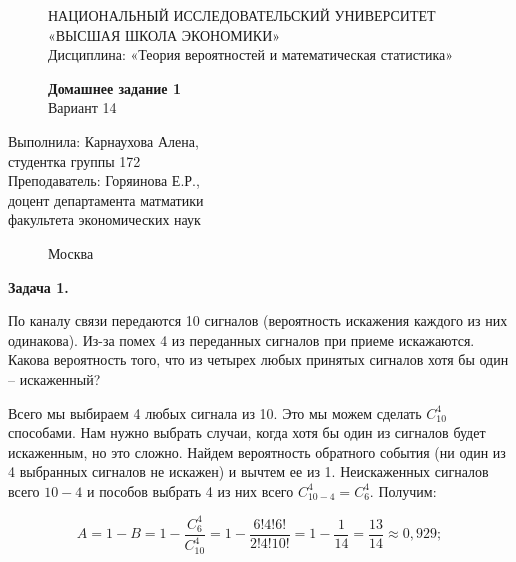 \documentclass[]{article}
\begin{document}
	\begin{figure}[t]
		\centering
		\large
		НАЦИОНАЛЬНЫЙ ИССЛЕДОВАТЕЛЬСКИЙ УНИВЕРСИТЕТ\\
		«ВЫСШАЯ ШКОЛА ЭКОНОМИКИ»\\
		Дисциплина: «Теория вероятностей и математическая статистика»
	\end{figure}
	
	\begin{figure}[h]
	\vspace{3in}
	\centering
	\Huge
	\textbf{Домашнее задание 1}\\
	Вариант 14 
	\end{figure}
	
	\vspace{2in}
	\Large
	\raggedleft
	Выполнила: Карнаухова Алена,\\
	студентка группы 172\\
	\vspace{12pt}
	Преподаватель: Горяинова Е.Р.,\\
	доцент департамента матматики\\
	факультета экономических наук
	
	\begin{figure}[b]
		\centering
		Москва \the\year
	\end{figure}
	
	\thispagestyle{empty}
	
	\newpage
	
	\centering
	\textbf{Задача 1.}
	
	\vspace{10pt}
	
	\raggedright
	\large

	По каналу связи передаются 10 сигналов (вероятность искажения каждого
из них одинакова). Из-за помех 4 из переданных сигналов при приеме искажаются. Какова
вероятность того, что из четырех любых принятых сигналов хотя бы один – искаженный?	

	\vspace{20pt}
	
	Всего мы выбираем 4 любых сигнала из 10. Это мы можем сделать $C_{10}^4$ способами. Нам нужно выбрать случаи, когда хотя бы один из сигналов будет искаженным, но это сложно. Найдем вероятность обратного события (ни один из 4 выбранных сигналов не искажен) и вычтем ее из 1. Неискаженных сигналов всего $10-4$ и пособов выбрать 4 из них всего $C_{10-4}^4 = C_{6}^4$. Получим:
	
	\begin{equation}
	A = 1 - B = 1 - \frac{C_6^4}{C_{10}^4} = 1 - \frac{6!4!6!}{2!4!10!} = 1 - \frac{1}{14} = \frac{13}{14} \approx 0,929;
	\end{equation}
	
\end{document}

